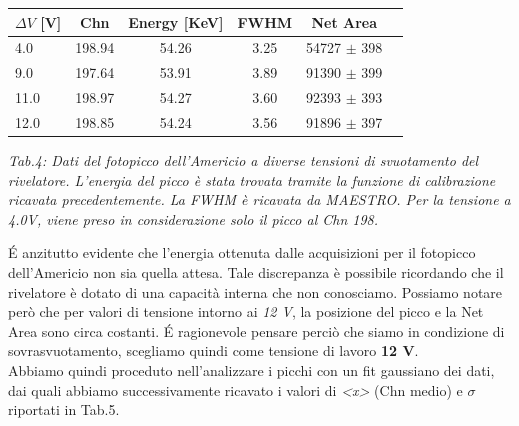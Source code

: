 \documentclass[a4paper]{article}
\begin{document}
\begin{center} 
		
		\begin{tabular}{lccccc}
			\hline
			\hline
			\textbf{$\Delta V$} [V]   &     \textbf{Chn}		&     \textbf{Energy} [KeV]		&     \textbf{FWHM}		&     \textbf{Net Area} 	 \\
			\hline
			\hline
				       4.0             &	198.94			&		54.26			&				3.25		&			54727 $\pm$ 398\\
				       9.0             &	197.64 			&		53.91			&				3.89		&			91390 $\pm$ 399\\
				       11.0		        &	198.97 			&		54.27			&				3.60		&			92393 $\pm$ 393\\
				       12.0		        & 	198.85 			&		54.24			&				3.56		&			91896 $\pm$ 397\\
			\hline
			\hline
		\end{tabular}
		\linebreak
		
		\emph{Tab.4: Dati del fotopicco dell'Americio a diverse tensioni di svuotamento del rivelatore. L'energia del picco è 							 stata trovata tramite la funzione di calibrazione ricavata precedentemente. La FWHM è ricavata da MAESTRO. Per la tensione a 4.0V, viene preso in considerazione solo il picco al Chn 198. } 
	\end{center} 	
\'E anzitutto evidente che l'energia ottenuta dalle acquisizioni per il fotopicco dell'Americio non sia quella attesa. Tale discrepanza è possibile ricordando che il rivelatore è dotato di una capacità interna che non conosciamo. 
Possiamo notare però che per valori di tensione intorno ai \emph{12 V}, la posizione del picco e la Net Area sono circa costanti. \'E ragionevole pensare perciò che siamo in condizione di sovrasvuotamento, scegliamo quindi come tensione di lavoro \textbf{12 V}.
\\

Abbiamo quindi proceduto nell'analizzare i picchi con un fit gaussiano dei dati, dai quali abbiamo successivamente ricavato i valori di \emph{<x>} (Chn medio) e $\sigma$ riportati in Tab.5.
\end{document}
